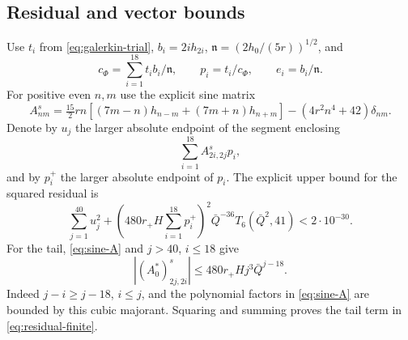 \subsection{Residual and vector bounds}
Use $t_i$ from \eqref{eq:galerkin-trial}, $b_i=2ih_{2i}$, $\mathfrak n=(2h_0/(5r))^{1/2}$, and
\[
 c_\Phi=\sum_{i=1}^{18}t_i b_i/\mathfrak n,\qquad
 p_i=t_i/c_\Phi,\qquad e_i=b_i/\mathfrak n.
\]
For positive even $n,m$ use the explicit sine matrix
\begin{equation}\label{eq:sine-A}
 A^s_{nm}=\tfrac{15}{2}rn\left[(7m-n)h_{n-m}+(7m+n)h_{n+m}\right]
 -(4r^2n^4+42)\delta_{nm}.
\end{equation}
Denote by $u_j$ the larger absolute endpoint of the segment enclosing
\[
 \sum_{i=1}^{18}A^s_{2i,2j}p_i,
\]
and by $p_i^+$ the larger absolute endpoint of $p_i$. The explicit upper bound for the squared residual is
\begin{equation}\label{eq:residual-finite}
 \sum_{j=1}^{40}u_j^2+
 \left(480r_+H\sum_{i=1}^{18}p_i^+\right)^2
 \bar Q^{-36}T_6(\bar Q^2,41)<2\cdot10^{-30}.
\end{equation}
For the tail, \eqref{eq:sine-A} and $j>40$, $i\le18$ give
\[
 |(A_0^*)^s_{2j,2i}|\le480r_+Hj^3\bar Q^{j-18}.
\]
Indeed $j-i\ge j-18$, $i\le j$, and the polynomial factors in \eqref{eq:sine-A} are bounded by this cubic majorant. Squaring and summing proves the tail term in \eqref{eq:residual-finite}.

